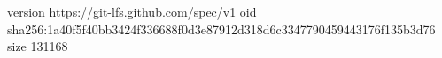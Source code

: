 version https://git-lfs.github.com/spec/v1
oid sha256:1a40f5f40bb3424f336688f0d3e87912d318d6c3347790459443176f135b3d76
size 131168
